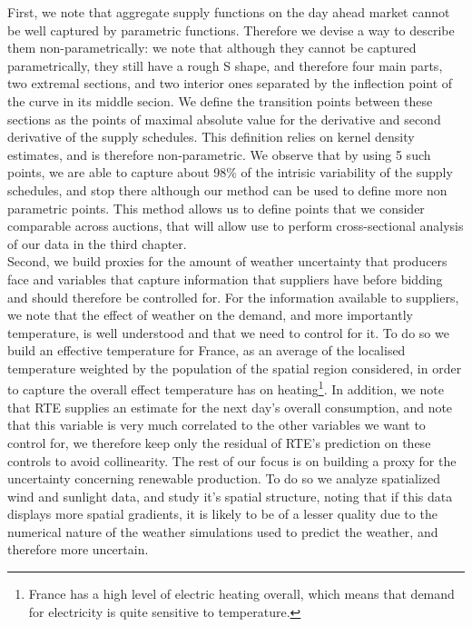 First, we note that aggregate supply functions on the day ahead market cannot be well captured by parametric functions. Therefore we devise a way to describe them non-parametrically: we note that although they cannot be captured parametrically, they still have a rough S shape, and therefore four main parts, two extremal sections, and two interior ones separated by the inflection point of the curve in its middle secion. We define the transition points between these sections as the points of maximal absolute value for the derivative and second derivative of the supply schedules. This definition relies on kernel density estimates, and is therefore non-parametric. We observe that by using 5 such points, we are able to capture about 98\% of the intrisic variability of the supply schedules, and stop there although our method can be used to define more non parametric points. This method allows us to define points that we consider comparable across auctions, that will allow use to perform cross-sectional analysis of our data in the third chapter. \\

Second, we build proxies for the amount of weather uncertainty that producers face and variables that capture information that suppliers have before bidding and should therefore be controlled for. For the information available to suppliers, we note that the effect of weather on the demand, and more importantly temperature, is well understood and that we need to control for it. To do so we build an effective temperature for France, as an average of the localised temperature weighted by the population of the spatial region considered, in order to capture the overall effect temperature has on heating\footnote{France has a high level of electric heating overall, which means that demand for electricity is quite sensitive to temperature.}. In addition, we note that RTE supplies an estimate for the next day's overall consumption, and note that this variable is very much correlated to the other variables we want to control for, we therefore keep only the residual of RTE's prediction on these controls to avoid collinearity. The rest of our focus is on building a proxy for the uncertainty concerning renewable production. To do so we analyze spatialized wind and sunlight data, and study it's spatial structure, noting that if this data displays more spatial gradients, it is likely to be of a lesser quality due to the numerical nature of the weather simulations used to predict the weather, and therefore more uncertain.\\

